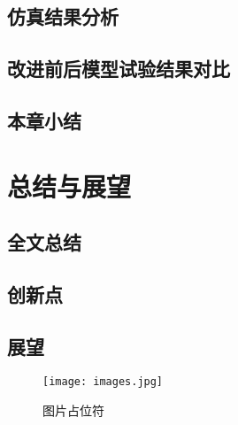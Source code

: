 \section{仿真结果分析}
\section{改进前后模型试验结果对比}
\section{本章小结}

\chapter{总结与展望}
\section{全文总结}
\section{创新点}
\section{展望}


\begin{figure}[htbp]
    \centering
    \texttt{[image: images.jpg]}
    \caption{\label{fig:fig-placeholder}图片占位符}
\end{figure}